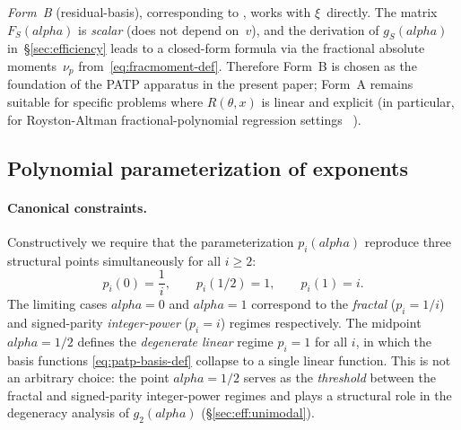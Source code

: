 \documentclass[11pt]{article}
\def\alpha{alpha}%
\def\mathbf#1{#1}%
\def\tfrac#1#2{#1/#2}%
\theoremstyle{definition}
\begin{document}
\emph{Form~B} (residual-basis), corresponding to
\citep[ch.~4]{kunchenko2002}, works with
$\xi$~directly. The matrix $\mathbf{F}_S(\alpha)$ is \emph{scalar} (does
not depend on~$v$), and the derivation of $g_S(\alpha)$ in~\S\ref{sec:efficiency}
leads to a closed-form formula via the fractional absolute moments~$\nu_p$
from~\eqref{eq:fracmoment-def}. Therefore Form~B is chosen as the foundation
of the PATP apparatus in the present paper; Form~A remains suitable for
specific problems where $R(\theta, x)$ is linear and explicit (in
particular, for Royston-Altman fractional-polynomial regression settings
~\citep{royston1994}).

\subsection{Polynomial parameterization of exponents}\label{sec:patp:param}

\paragraph{Canonical constraints.}
Constructively we require that the parameterization $p_i(\alpha)$
reproduce three structural points simultaneously for all $i \geq 2$:
\begin{equation}\label{eq:patp-constraints}
  p_i(0) = \frac{1}{i}, \qquad
  p_i\!\left(\tfrac{1}{2}\right) = 1, \qquad
  p_i(1) = i.
\end{equation}
The limiting cases $\alpha = 0$ and $\alpha = 1$ correspond to the
\emph{fractal} ($p_i = 1/i$) and signed-parity \emph{integer-power}
($p_i = i$) regimes respectively. The midpoint
$\alpha = \tfrac{1}{2}$ defines the \emph{degenerate linear} regime
$p_i = 1$ for all $i$, in which the basis functions
\eqref{eq:patp-basis-def} collapse to a single linear function.
This is not an arbitrary choice: the point $\alpha = \tfrac{1}{2}$ serves
as the \emph{threshold} between the fractal and signed-parity integer-power
regimes and plays a structural role in the degeneracy analysis of
$g_2(\alpha)$
(\S\ref{sec:eff:unimodal}).
\end{document}
